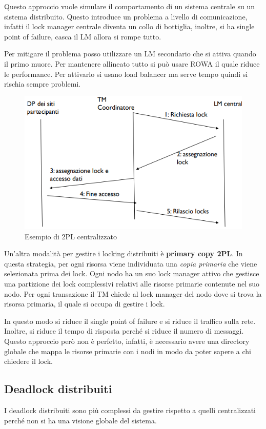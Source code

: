 Questo approccio vuole simulare il comportamento di un sistema centrale su un
sistema distribuito. Questo introduce un problema a livello di comunicazione,
infatti il lock manager centrale diventa un collo di bottiglia, inoltre, si ha
single point of failure, casca il LM allora si rompe tutto.

Per mitigare il problema posso utilizzare un LM secondario che si attiva quando
il primo muore. Per mantenere allineato tutto si può usare ROWA il quale riduce
le performance. Per attivarlo si usano load balancer ma serve tempo quindi si
rischia sempre problemi.
\begin{figure}[!ht]
      \centering
      \includegraphics[width=.5\textwidth]{img/DDBMS/centralized_2PL.png}
      \caption{Esempio di 2PL centralizzato}
      \label{fig:2PL_centralizzato}
\end{figure}

Un'altra modalità per gestire i locking distribuiti è \textbf{primary copy 2PL}.
In questa strategia, per ogni risorsa viene individuata una \textit{copia primaria}
che viene selezionata prima dei lock. Ogni nodo ha un suo lock manager attivo che
gestisce una partizione dei lock complessivi relativi alle risorse primarie
contenute nel suo nodo. Per ogni transazione il TM chiede al lock manager del nodo
dove si trova la risorsa primaria, il quale si occupa di gestire i lock.

In questo modo si riduce il single point of failure e si riduce il traffico
sulla rete. Inoltre, si riduce il tempo di risposta perché si riduce il numero
di messaggi. Questo approccio però non è perfetto, infatti, è necessario avere
una directory globale che mappa le risorse primarie con i nodi in modo da poter
sapere a chi chiedere il lock.
\subsection{Deadlock distribuiti}
I deadlock distribuiti sono più complessi da gestire rispetto a quelli centralizzati
perché non si ha una visione globale del sistema.

